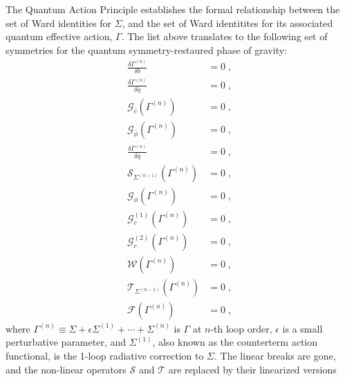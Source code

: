 \documentclass[../main.tex]{subfiles}
\begin{document}
The Quantum Action Principle establishes the formal relationship between the set of Ward identities for $ \Sigma $, and the set of Ward identitites for its associated quantum effective action, $ \Gamma $. The list above translates to the following set of symmetries for the quantum symmetry-restaured phase of gravity:
\begin{subequations}%
  \label{eq:ward-identities}
  \begin{align}
    \frac{ \delta \Gamma^{ \left( n \right) } }{ \delta b }            & = 0 \;, \\
    \frac{ \delta \Gamma^{ \left( n \right) } }{ \delta \bar{ \eta } } & = 0 \;, \\
    \mathcal{G}_{ \bar{ c } } \left( \Gamma ^{ (n) } \right)           & = 0 \;, \\
    \mathcal{G}_{ \bar{ \phi  } } \left( \Gamma ^{ (n) } \right)       & = 0 \;, \\
    \frac{ \delta \Gamma^{ \left( n \right) } }{ \delta \bar{ \eta } } & = 0 \;, \\
    \mathcal{S}_{\Sigma^{(n-1)}} \left( \Gamma^{ (n)} \right)          & = 0 \;, \\
    \mathcal{G}_{ \phi } \left( \Gamma ^{ (n) } \right)                & = 0 \;, \\
    \mathcal{G}^{(1)}_{ c } \left( \Gamma ^{ (n) } \right)             & = 0 \;, \\
    \mathcal{G}^{(2)}_{ c } \left( \Gamma ^{ (n) } \right)             & = 0 \;, \\
    \mathcal{W} \left( \Gamma^{ (n)} \right)                           & = 0 \;, \\
    \mathcal{T}_{\Sigma^{(n-1)}} \left( \Gamma^{ (n)} \right)          & = 0 \;, \\
    \mathcal{F} \left( \Gamma^{ (n)} \right)                           & = 0 \;,
  \end{align}
\end{subequations}
where $\Gamma^{(n)} \equiv \Sigma + \epsilon \Sigma^{(1)} + \cdots + \Sigma^{ (n) }$ is $ \Gamma  $ at $ n $-th loop order, $ \epsilon $ is a small perturbative parameter, and $ \Sigma^{ (1)} $, also known as the counterterm action functional, is the 1-loop radiative correction to $ \Sigma  $. The linear breaks are gone, and the non-linear operators $ \mathcal{S} $ and $ \mathcal{T} $ are replaced by their linearized versions
\end{document}
